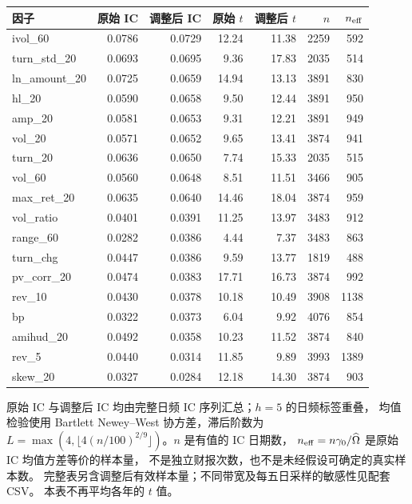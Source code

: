 \documentclass[UTF8,10pt,a4paper]{ctexart}
\begin{document}
\begin{center}
\small
\begin{tabular}{@{}lrrrrrr@{}}
\toprule
因子 & 原始 IC & 调整后 IC & 原始 $t$ & 调整后 $t$ & $n$ & $n_{\rm eff}$ \\
\midrule
ivol\_60 & 0.0786 & 0.0729 & 12.24 & 11.38 & 2259 & 592 \\
turn\_std\_20 & 0.0693 & 0.0695 & 9.36 & 17.83 & 2035 & 514 \\
ln\_amount\_20 & 0.0725 & 0.0659 & 14.94 & 13.13 & 3891 & 830 \\
hl\_20 & 0.0590 & 0.0658 & 9.50 & 12.44 & 3891 & 950 \\
amp\_20 & 0.0581 & 0.0653 & 9.31 & 12.21 & 3891 & 949 \\
vol\_20 & 0.0571 & 0.0652 & 9.65 & 13.41 & 3874 & 941 \\
turn\_20 & 0.0636 & 0.0650 & 7.74 & 15.33 & 2035 & 515 \\
vol\_60 & 0.0560 & 0.0648 & 8.51 & 11.51 & 3466 & 905 \\
max\_ret\_20 & 0.0635 & 0.0640 & 14.46 & 18.04 & 3874 & 959 \\
vol\_ratio & 0.0401 & 0.0391 & 11.25 & 13.97 & 3483 & 912 \\
range\_60 & 0.0282 & 0.0386 & 4.44 & 7.37 & 3483 & 863 \\
turn\_chg & 0.0447 & 0.0386 & 9.59 & 13.77 & 1819 & 488 \\
pv\_corr\_20 & 0.0474 & 0.0383 & 17.71 & 16.73 & 3874 & 992 \\
rev\_10 & 0.0430 & 0.0378 & 10.18 & 10.49 & 3908 & 1138 \\
bp & 0.0322 & 0.0373 & 6.04 & 9.92 & 4076 & 854 \\
amihud\_20 & 0.0492 & 0.0358 & 10.23 & 11.52 & 3874 & 840 \\
rev\_5 & 0.0440 & 0.0314 & 11.85 & 9.89 & 3993 & 1389 \\
skew\_20 & 0.0327 & 0.0284 & 12.18 & 14.30 & 3874 & 903 \\
\bottomrule
\end{tabular}
\end{center}
原始 IC 与调整后 IC 均由完整日频 IC 序列汇总；$h=5$ 的日频标签重叠，
均值检验使用 Bartlett Newey--West 协方差，滞后阶数为
$L=\max(4,\lfloor4(n/100)^{2/9}\rfloor)$。$n$ 是有值的 IC 日期数，
$n_{\rm eff}=n\gamma_0/\widehat\Omega$ 是原始 IC 均值方差等价的样本量，
不是独立财报次数，也不是未经假设可确定的真实样本数。
完整表另含调整后有效样本量；不同带宽及每五日采样的敏感性见配套 CSV。
本表不再平均各年的 $t$ 值。
\end{document}
